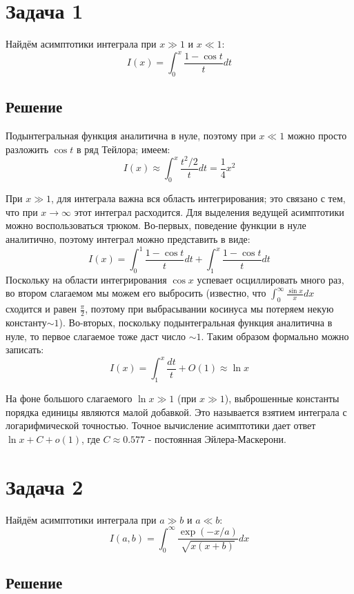 \documentclass[a4paper,12pt]{article}
\begin{document}
\section{Задача 1}

Найдём асимптотики интеграла при $x\gg1$ и $x\ll1$:
\[
I(x)=\int_{0}^{x}\frac{1-\cos t}{t}dt
\]



\subsection{Решение}

Подынтегральная функция аналитична в нуле, поэтому при $x\ll1$ можно
просто разложить $\cos t$ в ряд Тейлора; имеем:
\[
I\left(x\right)\approx\int_{0}^{x}\frac{t^{2}/2}{t}dt=\frac{1}{4}x^{2}
\]

\noindent
При $x\gg1$, для интеграла важна вся область интегрирования; это
связано с тем, что при $x\to\infty$ этот интеграл расходится. Для
выделения ведущей асимптотики можно воспользоваться трюком. Во-первых,
поведение функции в нуле аналитично, поэтому интеграл можно представить
в виде:
\[
I\left(x\right)=\int_{0}^{1}\frac{1-\cos t}{t}dt+\int_{1}^{x}\frac{1-\cos t}{t}dt
\]
Поскольку на области интегрирования $\cos x$ успевает осциллировать
много раз, во втором слагаемом мы можем его выбросить (известно, что
$\int_{0}^{\infty}\frac{\sin x}{x}dx$ сходится и равен $\frac{\pi}{2}$,
поэтому при выбрасывании косинуса мы потеряем некую константу$\sim1$).
Во-вторых, поскольку подынтегральная функция аналитична в нуле, то
первое слагаемое тоже даст число $\sim1$. Таким образом формально
можно записать:
\[
I\left(x\right)=\int_{1}^{x}\frac{dt}{t}+O(1)\approx\ln x
\]

\noindent
На фоне большого слагаемого $\ln x\gg1$ (при $x\gg1$), выброшенные
константы порядка единицы являются малой добавкой. Это называется
взятием интеграла с логарифмической точностью. Точное вычисление асимптотики
дает ответ $\ln x+C+o(1)$, где $C\approx0.577$ - постоянная Эйлера-Маскерони.


\section{Задача 2}

Найдём асимптотики интеграла при $a\gg b$ и $a\ll b$:
\[
I(a,b)=\int_{0}^{\infty}\frac{\exp(-x/a)}{\sqrt{x(x+b)}}dx
\]



\subsection{Решение}
\end{document}
